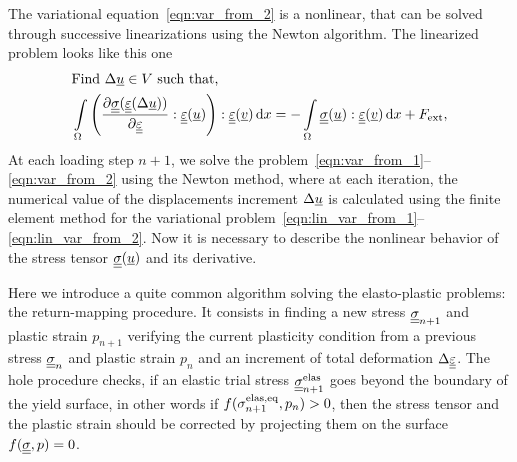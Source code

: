 \documentclass[12pt]{article}
\newcommand{\todounderline}[1]{\todo[inline, size=\scriptsize]{#1}}
\begin{document}
The variational equation~\ref{eqn:var_from_2} is a nonlinear, that can be solved through successive linearizations using the
Newton algorithm. The linearized problem looks like this one
\begin{align}
    & \text{Find } \Delta\underline{u} \in V \text{ such that,} \label{eqn:lin_var_from_1} \\ 
    & \int\limits_\Omega \left(\frac{\partial\underline{\underline{\sigma}}(\underline{\underline{\varepsilon}}(\Delta\underline{u}))}{\partial\underline{\underline{\varepsilon}}} : \underline{\underline{\varepsilon}}(\underline{u})\right) : \underline{\underline{\varepsilon}}(\underline{v}) \, \mathrm{d} x = -\int\limits_\Omega\underline{\underline{\sigma}}(\underline{u}) : \underline{\underline{\varepsilon}}(\underline{v}) \, \mathrm{d} x + F_\text{ext} \label{eqn:lin_var_from_2},
\end{align}
At each loading step $n+1$, we solve the problem~\ref{eqn:var_from_1}--\ref{eqn:var_from_2} using the Newton method, where at each iteration, the numerical value of the displacements increment $\Delta\underline{u}$ is calculated using the finite element method for the variational problem~\ref{eqn:lin_var_from_1}--\ref{eqn:lin_var_from_2}. Now it is necessary to describe the nonlinear behavior of the stress tensor $\underline{\underline{\sigma}}(\underline{u})$ and its derivative.

Here we introduce a quite common algorithm solving the elasto-plastic problems: the return-mapping procedure. It consists in finding a new stress $\underline{\underline{\sigma}}_{n+1}$ and plastic strain $p_{n+1}$ verifying the current plasticity condition from a previous stress $\underline{\underline{\sigma}}_{n}$ and plastic strain $p_n$ and an increment of total deformation $\Delta\underline{\underline{\varepsilon}}$. The hole procedure checks, if an elastic trial stress $\underline{\underline{\sigma}}_{n+1}^{\text{elas}}$ goes beyond the boundary of the yield surface, in other words if $f(\sigma_{n+1}^\text{elas,eq}, p_n) > 0$, then the stress tensor and the plastic strain should be corrected by projecting them on the surface $f(\underline{\underline{\sigma}}, p) = 0$. 
\end{document}
